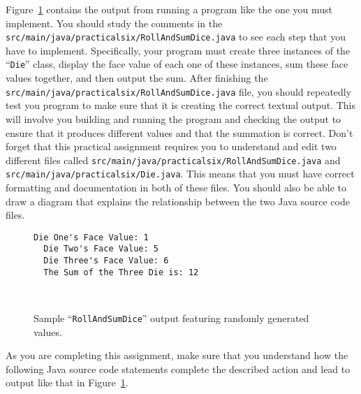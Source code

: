 \documentclass[11pt]{article}
\newcommand{\mainprogramsource}{\lstinline{src/main/java/practicalsix/RollAndSumDice.java}}
\newcommand{\secondprogramsource}{\lstinline{src/main/java/practicalsix/Die.java}}
\newcommand{\command}[1]{``\lstinline{#1}''}
\begin{document}
Figure~\ref{fig:roll} contains the output from running a program like the one
you must implement. You should study the comments in the \mainprogramsource{} to
see each step that you have to implement. Specifically, your program must create
three instances of the \command{Die} class, display the face value of each one
of these instances, sum these face values together, and then output the sum.
After finishing the \mainprogramsource{} file, you should repeatedly test you
program to make sure that it is creating the correct textual output. This will
involve you building and running the program and checking the output to ensure
that it produces different values and that the summation is correct. Don't
forget that this practical assignment requires you to understand and edit two
different files called \mainprogramsource{} and \secondprogramsource{}. This
means that you must have correct formatting and documentation in both of these
files. You should also be able to draw a diagram that explains the relationship
between the two Java source code files.

\begin{figure}[tb]
\begin{Verbatim}[commandchars=\\\{\}]
  Die One's Face Value: 1
  Die Two's Face Value: 5
  Die Three's Face Value: 6
  The Sum of the Three Die is: 12
\end{Verbatim}
\vspace*{-.1in}
\caption{Sample ``{\tt RollAndSumDice}'' output featuring randomly generated
values.}~\label{fig:roll}
\vspace*{-.25in}
\end{figure}

As you are completing this assignment, make sure that you understand how the
following Java source code statements complete the described action and lead to
output like that in Figure~\ref{fig:roll}.
\end{document}
